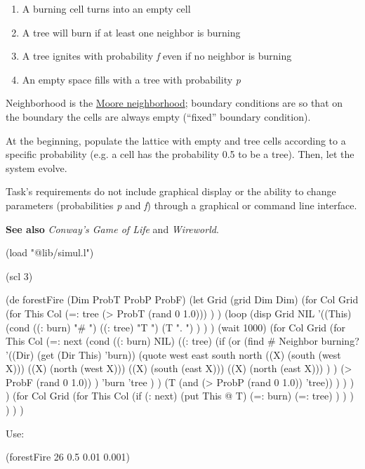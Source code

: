 \begin{enumerate}
\item
  A burning cell turns into an empty cell
\item
  A tree will burn if at least one neighbor is burning
\item
  A tree ignites with probability \emph{f} even if no neighbor is
  burning
\item
  An empty space fills with a tree with probability \emph{p}
\end{enumerate}

Neighborhood is the
\href{http://en.wikipedia.org/wiki/Moore\_neighborhood}{Moore
neighborhood}; boundary conditions are so that on the boundary the cells
are always empty (``fixed'' boundary condition).

At the beginning, populate the lattice with empty and tree cells
according to a specific probability (e.g. a cell has the probability 0.5
to be a tree). Then, let the system evolve.

Task's requirements do not include graphical display or the ability to
change parameters (probabilities \emph{p} and \emph{f}) through a
graphical or command line interface.

\textbf{See also} \emph{Conway's Game of Life} and \emph{Wireworld}.


\begin{wideverbatim}

(load "@lib/simul.l")

(scl 3)

(de forestFire (Dim ProbT ProbP ProbF)
   (let Grid (grid Dim Dim)
      (for Col Grid
         (for This Col
            (=: tree (> ProbT (rand 0 1.0))) ) )
      (loop
         (disp Grid NIL
            '((This)
               (cond
                  ((: burn) "# ")
                  ((: tree) "T ")
                  (T ". ") ) ) )
         (wait 1000)
         (for Col Grid
            (for This Col
               (=: next
                  (cond
                     ((: burn) NIL)
                     ((: tree)
                        (if
                           (or
                              (find  # Neighbor burning?
                                 '((Dir) (get (Dir This) 'burn))
                                 (quote
                                    west east south north
                                    ((X) (south (west X)))
                                    ((X) (north (west X)))
                                    ((X) (south (east X)))
                                    ((X) (north (east X))) ) )
                              (> ProbF (rand 0 1.0)) )
                           'burn
                           'tree ) )
                     (T (and (> ProbP (rand 0 1.0)) 'tree)) ) ) ) )
         (for Col Grid
            (for This Col
               (if (: next)
                  (put This @ T)
                  (=: burn)
                  (=: tree) ) ) ) ) ) )

Use:

(forestFire 26 0.5 0.01 0.001)

\end{wideverbatim}

